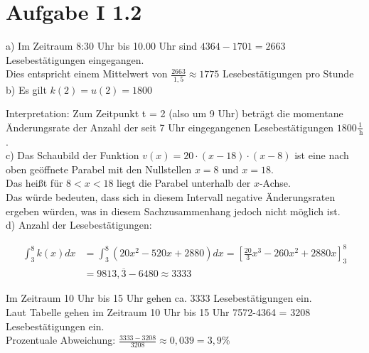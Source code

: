\documentclass[10pt]{article}
\begin{document}
\section*{Aufgabe I 1.2}
a) Im Zeitraum 8:30 Uhr bis 10.00 Uhr sind $4364-1701=2663$ Lesebestätigungen eingegangen.\\
Dies entspricht einem Mittelwert von $\frac{2663}{1,5} \approx 1775$ Lesebestätigungen pro Stunde\\
b) Es gilt $k(2)=u(2)=1800$

Interpretation: Zum Zeitpunkt t = 2 (also um 9 Uhr) beträgt die momentane Änderungsrate der Anzahl der seit 7 Uhr eingegangenen Lesebestätigungen $1800 \frac{1}{\mathrm{~h}}$.\\
c) Das Schaubild der Funktion $v(x)=20 \cdot(x-18) \cdot(x-8)$ ist eine nach oben geöffnete Parabel mit den Nullstellen $x=8$ und $x=18$.\\
Das heißt für $8<x<18$ liegt die Parabel unterhalb der $x$-Achse.\\
Das würde bedeuten, dass sich in diesem Intervall negative Änderungsraten ergeben würden, was in diesem Sachzusammenhang jedoch nicht möglich ist.\\
d) Anzahl der Lesebestätigungen:

$$
\begin{aligned}
\int_{3}^{8} k(x) d x & =\int_{3}^{8}\left(20 x^{2}-520 x+2880\right) d x=\left[\frac{20}{3} x^{3}-260 x^{2}+2880 x\right]_{3}^{8} \\
& =9813, \overline{3}-6480 \approx 3333
\end{aligned}
$$

Im Zeitraum 10 Uhr bis 15 Uhr gehen ca. 3333 Lesebestätigungen ein.\\
Laut Tabelle gehen im Zeitraum 10 Uhr bis 15 Uhr 7572-4364 = 3208\\
Lesebestätigungen ein.\\
Prozentuale Abweichung: $\frac{3333-3208}{3208} \approx 0,039=3,9 \%$
\end{document}
